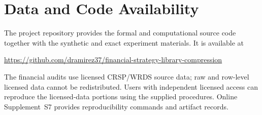 \documentclass[11pt]{article}
\numberwithin{equation}{section}
\theoremstyle{definition}
\theoremstyle{plain}
\begin{document}
\section*{Data and Code Availability}
The project repository provides the formal and computational source code
together with the synthetic and exact experiment materials.  It is available
at
\begin{center}
\url{https://github.com/dramirez37/financial-strategy-library-compression}
\end{center}
The financial audits use licensed CRSP/WRDS source data; raw and row-level
licensed data cannot be redistributed.  Users with independent licensed access
can reproduce the licensed-data portions using the supplied procedures.
Online Supplement~S7 provides reproducibility commands and artifact records.




\appendix








\end{document}
